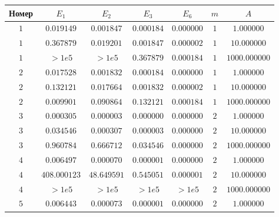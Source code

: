 \documentclass[14pt,a4paper]{extarticle}
\newcommand{\1}{\mathbbm{1}}
\begin{document}
\begin{table}[h!] 
    \begin{center} 
    \begin{tabular}{|c|c|c|c|c|c|c|} 
    \hline 
    Номер  & $E_1$ & $E_2$ & $E_3$ & $E_6$ & $m$ & $A$ \\ \hline
     $1$ &  $0.019149$ & $0.001847$ & $0.000184$ & $0.000000$ & $1$ & $1.000000$ \\ \hline 
    
     $1$ &  $0.367879$ & $0.019201$ & $0.001847$ & $0.000002$ & $1$ & $10.000000$ \\ \hline 
    
     $1$ &  $>1e5$ & $>1e5$ & $0.367879$ & $0.000184$ & $1$ & $1000.000000$ \\ \hline 
    
     $2$ &  $0.017528$ & $0.001832$ & $0.000184$ & $0.000000$ & $1$ & $1.000000$ \\ \hline 
    
     $2$ &  $0.132121$ & $0.017664$ & $0.001832$ & $0.000002$ & $1$ & $10.000000$ \\ \hline 
    
     $2$ &  $0.009901$ & $0.090864$ & $0.132121$ & $0.000184$ & $1$ & $1000.000000$ \\ \hline 
    
     $3$ &  $0.000305$ & $0.000003$ & $0.000000$ & $0.000000$ & $2$ & $1.000000$ \\ \hline 
    
     $3$ &  $0.034546$ & $0.000307$ & $0.000003$ & $0.000000$ & $2$ & $10.000000$ \\ \hline 
    
     $3$ &  $0.960784$ & $0.666712$ & $0.034546$ & $0.000000$ & $2$ & $1000.000000$ \\ \hline 
    
     $4$ &  $0.006497$ & $0.000070$ & $0.000001$ & $0.000000$ & $2$ & $1.000000$ \\ \hline 
    
     $4$ &  $408.000123$ & $48.649591$ & $0.545051$ & $0.000001$ & $2$ & $10.000000$ \\ \hline 
    
     $4$ &  $>1e5$ & $>1e5$ & $>1e5$ & $>1e5$ & $2$ & $1000.000000$ \\ \hline 
    
     $5$ &  $0.006443$ & $0.000073$ & $0.000001$ & $0.000000$ & $2$ & $1.000000$ \\ \hline 
    

\end{tabular}
\end{center}
\end{table}
\end{document}
